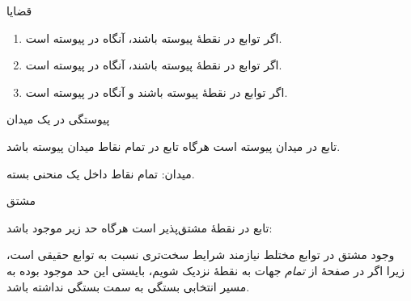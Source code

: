 \begin{EMtheorem}{قضایا}

\begin{enumerate}
\def\labelenumi{\arabic{enumi}.}
\tightlist
\item
  اگر توابع  در نقطهٔ  پیوسته باشند، آنگاه  در  پیوسته است.
\item
  اگر توابع  در نقطهٔ  پیوسته باشند، آنگاه  در  پیوسته است.
\item
  اگر توابع  در نقطهٔ  پیوسته باشند و  آنگاه  در  پیوسته است.
\end{enumerate}

\end{EMtheorem}

\begin{EMdefinition}{پیوستگی در یک میدان}

تابع  در میدان  پیوسته است هرگاه تابع  در تمام نقاط میدان  پیوسته باشد.

میدان: تمام نقاط داخل یک منحنی بسته.

\end{EMdefinition}


\EMhold


\begin{EMdefinition}{مشتق}

تابع  در نقطهٔ  مشتق‌پذیر است هرگاه حد زیر موجود باشد:

\end{EMdefinition}

\begin{EMremark}{}

وجود مشتق در توابع مختلط نیازمند شرایط سخت‌تری نسبت به توابع حقیقی است، زیرا اگر در صفحهٔ  از \emph{تمام} جهات به نقطهٔ  نزدیک شویم، بایستی این حد موجود بوده به مسیر انتخابی بستگی به سمت  بستگی نداشته باشد.

\end{EMremark}


\EMhold

